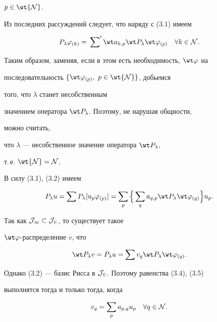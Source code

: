 \begin{pf}
$p\in\wt{\cal N}$. 


Из последних рассуждений следует, что наряду с (3.1) имеем


$$ 


P_\lambda\varphi_{(k)}=\sideset{}{'}\sum\wt a_{k,p}\wt P_\lambda 


\wt\varphi_{(p)}\quad \forall k\in\cal N. 


$$ 


Таким образом, заменяя, если в этом есть необходимость, $\wt\varphi$ на 


последовательность $\{\wt\varphi_{(p)},\ p\in\wt{\cal N}\}$, добьемся 


того, что $\lambda$ станет несобственным 


значением оператора $\wt P_\lambda$. Поэтому, не нарушая общности, 


можно считать, 


что $\lambda$ --- несобственное значение оператора $\wt P_\lambda$, 


т.\,е. $\wt{\cal N}=\cal N$. 


 


В силу (3.1), (3.2) имеем 


\begin{equation} 


P_\lambda u=\sum P_\lambda[u_p\varphi_{(p)}]=\sum_p 


\Big\{\sum_q a_{q,p}\wt P_\lambda\wt\varphi_{(q)}\Big\}u_p. 


\end{equation} 


Так как $\cal J_1\subset \cal J_2$, то существует такое 


$\wt\varphi$-распределение $v$, что 


\begin{equation} 


\wt P_\lambda v=P_\lambda u=\sum v_q\wt P_\lambda\wt\varphi_{(q)}. 


\end{equation} 


Однако (3.2) --- базис Рисса в $\cal J_2$. Поэтому равенства (3.4), (3.5) 


выполнятся тогда и только тогда, когда 


\begin{equation} 


v_q=\sum_p a_{p,q}u_p\quad \forall q\in\cal N. 


\end{equation} 



\end{pf}
